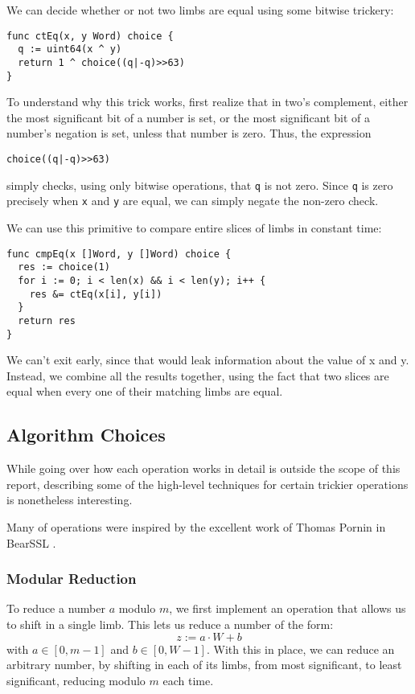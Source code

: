 \documentclass[11pt, a4paper]{article} %
\begin{document}
{We can decide whether or not two limbs are equal using some bitwise
trickery:

\begin{verbatim}
func ctEq(x, y Word) choice {
  q := uint64(x ^ y)
  return 1 ^ choice((q|-q)>>63)
}
\end{verbatim}

To understand why this trick works, first realize that in two's complement,
either the most significant bit of a number is set, or the most significant
bit of a number's negation is set, unless that number is zero.
Thus, the expression
\begin{verbatim}
choice((q|-q)>>63)
\end{verbatim}
simply checks, using only bitwise operations, that
\texttt{q} is not zero.
Since \texttt{q} is zero precisely when \texttt{x} and \texttt{y}
are equal, we can simply negate the non-zero check.

We can use this primitive to compare entire slices of limbs
in constant time:

\begin{verbatim}
func cmpEq(x []Word, y []Word) choice {
  res := choice(1)
  for i := 0; i < len(x) && i < len(y); i++ {
    res &= ctEq(x[i], y[i])
  }
  return res
}
\end{verbatim}

We can't exit early, since that would leak information about
the value of x and y. Instead, we combine all the results together,
using the fact that two slices are equal when every one of their
matching limbs are equal.

\subsection{Algorithm Choices}

While going over how each operation works in detail is outside
the scope of this report, describing some of the high-level
techniques for certain trickier operations is nonetheless interesting.

Many of operations were inspired by the excellent
work of Thomas Pornin in BearSSL
\cite{pornin_bearssl_2020-1}.

\subsubsection{Modular Reduction}

To reduce a number $a$ modulo $m$, we first implement an operation
that allows us to shift in a single limb. This
lets us reduce a number
of the form:
$$
z := a \cdot W + b
$$
with $a \in [0, m - 1]$ and $b \in [0, W - 1]$. With this in place,
we can reduce an arbitrary number, by shifting in each of its limbs,
from most significant, to least significant, reducing modulo $m$
each time.

}
\end{document}
